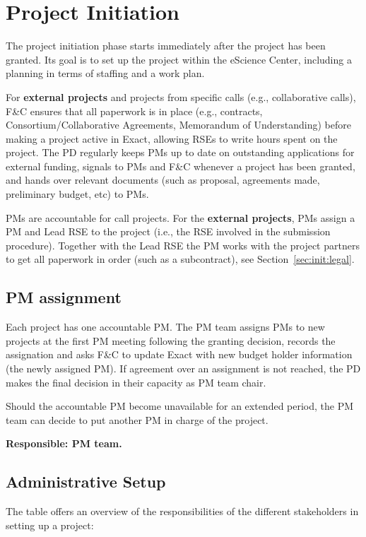 \section{Project Initiation}
\label{sec:init}
The project initiation phase starts immediately after the project has been granted. Its goal is to set up the project
within the eScience Center, including a planning in terms of staffing and a work plan.

For \textbf{external projects} and projects from specific calls (e.g., collaborative calls), F\&C ensures that all
paperwork is in place (e.g., contracts, Consortium/Collaborative Agreements, Memorandum of Understanding) before making
a project active in Exact, allowing RSEs to write hours spent on the project. The PD regularly keeps PMs up to date on
outstanding applications for external funding, signals to PMs and F\&C whenever a project has been granted, and hands
over relevant documents (such as proposal, agreements made, preliminary budget, etc) to PMs. 

PMs are accountable for call projects. For the \textbf{external projects}, PMs assign a PM and Lead RSE to the project
(i.e., the RSE involved in the submission procedure). Together with the Lead RSE the PM works with the project partners
to get all paperwork in order (such as a subcontract), see Section~\ref{sec:init:legal}. 

\subsection{PM assignment}
Each project has one accountable PM. The PM team assigns PMs to new projects at the first PM meeting following the
granting decision, records the assignation and asks F\&C to update Exact with new budget holder information (the newly
assigned PM). If agreement over an assignment is not reached, the PD makes the final decision in their capacity as PM
team chair.

Should the accountable PM become unavailable for an extended period, the PM team can decide to put another PM in charge
of the project.

\textbf{Responsible: PM team.}

\subsection{Administrative Setup}
The table offers an overview of the responsibilities of the different stakeholders in setting up a project:

